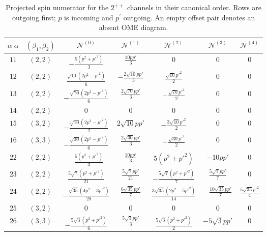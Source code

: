 \begin{table}[t]
\caption{Projected spin numerator for the $2^{++}$ channels in their canonical order. Rows are outgoing first; $p$ is incoming and $p^\prime$ outgoing. An empty offset pair denotes an absent OME diagram.}
\label{tab:projected-spin-numerator-2pp}
\centering
\begingroup\footnotesize
\setlength{\tabcolsep}{3pt}
\renewcommand{\arraystretch}{1.7}
\begin{tabular}{cc|ccccc}
$\alpha^\prime\alpha$ & $(\beta_1,\beta_2)$ & $\mathcal N^{(0)}$ & $\mathcal N^{(1)}$ & $\mathcal N^{(2)}$ & $\mathcal N^{(3)}$ & $\mathcal N^{(4)}$ \\ \hline
$11$ & $(2,2)$ & $- \frac{5 (p^{2} + p'^{2})}{3}$ & $\frac{10 p p'}{3}$ & $0$ & $0$ & $0$ \\
$12$ & $(2,2)$ & $\frac{\sqrt{10} (2 p^{2} - p'^{2})}{6}$ & $- \frac{2 \sqrt{10} p p'}{3}$ & $\frac{\sqrt{10} p'^{2}}{2}$ & $0$ & $0$ \\
$13$ & $(2,2)$ & $- \frac{\sqrt{70} (2 p^{2} - p'^{2})}{6}$ & $\frac{2 \sqrt{70} p p'}{3}$ & $- \frac{\sqrt{70} p'^{2}}{2}$ & $0$ & $0$ \\
$14$ & $(2,2)$ & $0$ & $0$ & $0$ & $0$ & $0$ \\
$15$ & $(3,2)$ & $- \frac{\sqrt{10} (2 p^{2} - p'^{2})}{2}$ & $2 \sqrt{10} p p'$ & $- \frac{3 \sqrt{10} p'^{2}}{2}$ & $0$ & $0$ \\
$16$ & $(3,3)$ & $- \frac{\sqrt{30} (2 p^{2} - p'^{2})}{6}$ & $\frac{2 \sqrt{30} p p'}{3}$ & $- \frac{\sqrt{30} p'^{2}}{2}$ & $0$ & $0$ \\
$22$ & $(2,2)$ & $- \frac{5 (p^{2} + p'^{2})}{3}$ & $\frac{10 p p'}{3}$ & $5 (p^{2} + p'^{2})$ & $- 10 p p'$ & $0$ \\
$23$ & $(2,2)$ & $\frac{5 \sqrt{7} (p^{2} + p'^{2})}{21}$ & $\frac{5 \sqrt{7} p p'}{21}$ & $- \frac{5 \sqrt{7} (p^{2} + p'^{2})}{7}$ & $\frac{5 \sqrt{7} p p'}{7}$ & $0$ \\
$24$ & $(2,2)$ & $- \frac{\sqrt{35} (4 p^{2} - 3 p'^{2})}{28}$ & $\frac{6 \sqrt{35} p p'}{7}$ & $\frac{3 \sqrt{35} (2 p^{2} - 5 p'^{2})}{14}$ & $- \frac{10 \sqrt{35} p p'}{7}$ & $\frac{5 \sqrt{35} p'^{2}}{4}$ \\
$25$ & $(3,2)$ & $0$ & $0$ & $0$ & $0$ & $0$ \\
$26$ & $(3,3)$ & $- \frac{5 \sqrt{3} (p^{2} + p'^{2})}{6}$ & $\frac{5 \sqrt{3} p p'}{3}$ & $\frac{5 \sqrt{3} (p^{2} + p'^{2})}{2}$ & $- 5 \sqrt{3} p p'$ & $0$ \\

\end{tabular}
\end{table}

